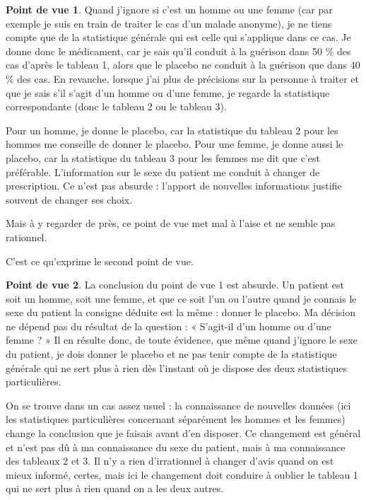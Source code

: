 \documentclass[10pt,dvipsnames, dvips, svgnames]{article}
\begin{document}
\begin{list}{}{}
\item \textbf{Point de vue 1}. Quand j'ignore si c'est un homme ou une femme (car par exemple je suis en train de traiter le cas d'un malade anonyme), je ne tiens compte que de la statistique générale qui est celle qui s'applique dans ce cas.  
Je donne donc le médicament, car je sais qu'il conduit à la guérison dans 50 \% des cas d'après le tableau 1, alors que le placebo ne conduit à la guérison que dans 40 \% des cas. En revanche, lorsque j'ai plus de précisions sur la personne à traiter et que je sais s'il s'agit d'un homme ou d'une femme, je regarde la statistique correspondante (donc le tableau 2 ou le tableau 3).

Pour un homme, je donne le placebo, car la statistique du tableau 2 pour les hommes me conseille de donner le placebo. Pour une femme, je donne aussi le placebo, car la statistique du tableau 3 pour les femmes me dit que c'est préférable. L'information sur le sexe du patient me conduit à changer de prescription. Ce n'est pas absurde : l'apport de nouvelles informations justifie souvent de changer ses choix.

Mais à y regarder de près, ce point de vue met mal à l'aise et ne semble pas rationnel.

C'est ce qu'exprime le second point de vue.

\item \textbf{Point de vue 2}. La conclusion du point de vue 1 est absurde. Un patient est soit un homme, soit une femme, et que ce soit l'un ou l'autre quand je connais le sexe du patient la consigne déduite est la même : donner le placebo. Ma décision ne dépend pas du résultat de la question : « S'agit-il d'un homme ou d'une femme ? » Il en résulte donc, de toute évidence, que même quand j'ignore le sexe du patient, je dois donner le placebo et ne pas tenir compte de la statistique générale qui ne sert plus à rien dès l'instant où je dispose des deux statistiques particulières.  

On se trouve dans un cas assez usuel : la connaissance de nouvelles données (ici les statistiques particulières concernant séparément les hommes et les femmes) change la conclusion que je faisais avant d'en disposer. Ce changement est général et n'est pas dû à ma connaissance du sexe du patient, mais à ma connaissance des tableaux 2 et 3. Il n'y a rien d'irrationnel à changer d'avis quand on est mieux informé, certes, mais ici le changement doit conduire à oublier le tableau 1 qui ne sert plus à rien quand on a les deux autres. 


\end{list}
\end{document}
